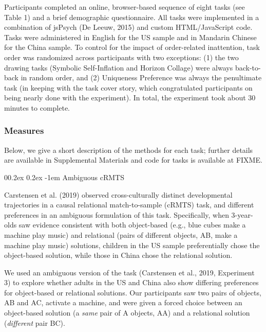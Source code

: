 \documentclass[
  man,floatsintext]{apa6}
\makeatletter
\let\oldparagraph\paragraph
\renewcommand{\paragraph}[1]{\oldparagraph{#1}\mbox{}}
\renewcommand{\paragraph}{\@startsection{paragraph}{4}{\parindent}%
  {0\baselineskip \@plus 0.2ex \@minus 0.2ex}%
  {-1em}%
  {\normalfont\normalsize\bfseries\itshape\typesectitle}}
\makeatother
\begin{document}
Participants completed an online, browser-based sequence of eight tasks (see Table 1) and a brief demographic questionnaire. All tasks were implemented in a combination of jsPsych (De Leeuw, 2015) and custom HTML/JavaScript code. Tasks were administered in English for the US sample and in Mandarin Chinese for the China sample. To control for the impact of order-related inattention, task order was randomized across participants with two exceptions: (1) the two drawing tasks (Symbolic Self-Inflation and Horizon Collage) were always back-to-back in random order, and (2) Uniqueness Preference was always the penultimate task (in keeping with the task cover story, which congratulated participants on being nearly done with the experiment). In total, the experiment took about 30 minutes to complete.

\hypertarget{measures}{%
\subsubsection{Measures}\label{measures}}

Below, we give a short description of the methods for each task; further details are available in Supplemental Materials and code for tasks is available at FIXME.

\hypertarget{ambiguous-crmts}{%
\paragraph{Ambiguous cRMTS}\label{ambiguous-crmts}}

Carstensen et al. (2019) observed cross-culturally distinct developmental trajectories in a causal relational match-to-sample (cRMTS) task, and different preferences in an ambiguous formulation of this task. Specifically, when 3-year-olds saw evidence consistent with both object-based (e.g., blue cubes make a machine play music) and relational (pairs of different objects, AB, make a machine play music) solutions, children in the US sample preferentially chose the object-based solution, while those in China chose the relational solution.

We used an ambiguous version of the task (Carstensen et al., 2019, Experiment 3) to explore whether adults in the US and China also show differing preferences for object-based or relational solutions. Our participants saw two pairs of objects, AB and AC, activate a machine, and were given a forced choice between an object-based solution (a \emph{same} pair of A objects, AA) and a relational solution (\emph{different} pair BC).
\end{document}
